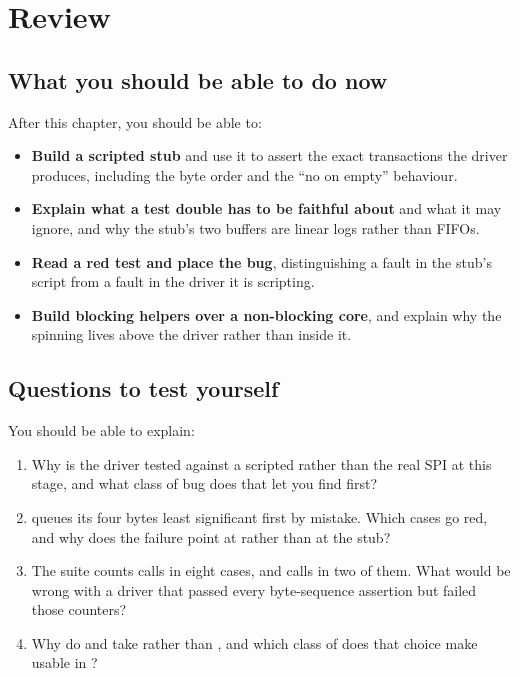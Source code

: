 
\section{Review}
\label{c8:sec:review}

\subsection*{What you should be able to do now}
After this chapter, you should be able to:
\begin{itemize}
  \item \textbf{Build a scripted stub} and use it to assert the exact transactions the driver
    produces, including the byte order and the ``no  on empty'' behaviour.
  \item \textbf{Explain what a test double has to be faithful about} and what it may ignore, and why
    the stub's two buffers are linear logs rather than FIFOs.
  \item \textbf{Read a red test and place the bug}, distinguishing a fault in the stub's script from
    a fault in the driver it is scripting.
  \item \textbf{Build blocking helpers over a non-blocking core}, and explain why the spinning lives
    above the driver rather than inside it.
\end{itemize}

\subsection*{Questions to test yourself}
You should be able to explain:
\begin{enumerate}
  \item Why is the driver tested against a scripted  rather than the
    real SPI at this stage, and what class of bug does that let you find first?
  \item {} queues its four bytes least significant first by mistake. Which cases go
    red, and why does the failure point at  rather than at the stub?
  \item The suite counts  calls in eight cases, and  calls in two of
    them. What would be wrong
    with a driver that passed every byte-sequence assertion but failed those counters?
  \item Why do  and  take  rather than
    , and which class of  does that choice make usable in ?
\end{enumerate}

